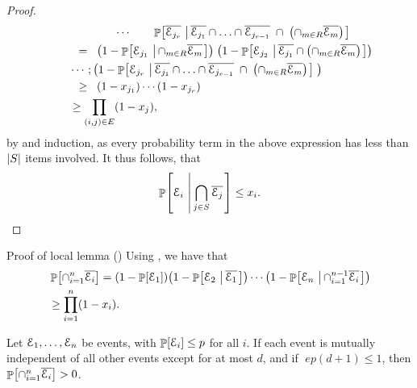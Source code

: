 \begin{proof}
\begin{align*}
        &
        \qquad\qquad\qquad\cdots \qquad
           \Prob{\overline{\Event_{j_r}} \sep{ \overline{\Event_{j_1}} \cap
              \ldots \cap \overline{\Event_{j_{r-1}}}
        \;\cap \; \pth{ \cap_{m \in R} \overline{\Event_m}}}}
      \\&
      \qquad\EQ 
        \pth{1 - \Prob{{\Event_{j_1}} \sep{
                 \cap_{m \in R} \overline{\Event_m}}}} \;
        \pth{ 1 - \Prob{{\Event_{j_2}} \sep{ \overline{\Event_{j_1}} \cap
                 \pth{ \cap_{m \in R} \overline{\Event_m}}}}} 
        \\&
        \qquad\cdots ;
        \pth{ 1 - \Prob{{\Event_{j_r}} \sep{ \overline{\Event_{j_1}} \cap
                 \ldots \cap \overline{\Event_{j_{r-1}}} \;\cap\;
                 \pth{ \cap_{m \in R} \overline{\Event_m}}}} \;} 
        \\&
        \qquad\GEQ
        \pth{1 -x_{j_1}} \cdots \pth{1 - x_{j_r}}
        \\&
        \qquad\geq \prod_{(i,j) \in E} \pth{1 -x_j},
    \end{align*}
    by  and induction, as every probability term
    in the above expression has less than $\left| {S} \right|$ items
    involved. It thus follows, that
    \[
    \Prob{\Event_i \sep{\bigcap_{j \in S} \overline{\Event_j}}} \leq
    x_i.
    \]
\end{proof}


\noindent\begin{proofExt}{Proof of \Lovasz{} local lemma
       ()} Using , we have that
    \begin{align*}
    &\Prob{\cap_{i=1}^{n} \overline{\Event_i}} = \pth{1 -
       \Prob{\Event_1}} \pth{1 - \Prob{\Event_2 \sep{\overline{\Event_1}}}}
    \cdots \pth{1 - \Prob{\Event_n \sep{ \cap_{i=1}^{n-1}
             \overline{\Event_{i}}}}}
    \\&\geq
    \prod_{i=1}^{n} \pth{1-x_i}.
    \end{align*}   
\end{proofExt}

\bigskip

\begin{corollary}%
    Let $\EuScript{E}_1, \ldots, \EuScript{E}_n$ be events, with $\Prob{\Event_i} \leq
    p$ for all $i$. If each event is mutually independent of
    all other events except for at most $d$, and if
    $\;e p(d+1)\leq 1$, then $\Prob{\cap_{i=1}^{n}
       \overline{\Event_{i}}} > 0$.    
\end{corollary}

